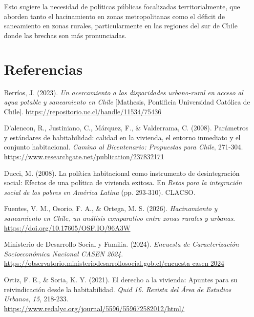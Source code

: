 \documentclass[
  spanish,
  a4paper,
  oneside]{scrbook}
\newlength{\cslhangindent}
\newenvironment{CSLReferences}[2] %
 {\begin{list}{}{%
  \setlength{\itemindent}{0pt}
  \setlength{\leftmargin}{0pt}
  \setlength{\parsep}{0pt}
  \ifodd #1
   \setlength{\leftmargin}{\cslhangindent}
   \setlength{\itemindent}{-1\cslhangindent}
  \fi
  \setlength{\itemsep}{#2\baselineskip}}}
 {\end{list}}
\begin{document}
Esto sugiere la necesidad de políticas públicas focalizadas
territorialmente, que aborden tanto el hacinamiento en zonas
metropolitanas como el déficit de saneamiento en zonas rurales,
particularmente en las regiones del sur de Chile donde las brechas son
más pronunciadas.


\chapter{Referencias}\label{referencias}

\protect{}\label{refs}
\begin{CSLReferences}{1}{0}
Berríos, J. (2023). \emph{Un acercamiento a las disparidades
urbano-rural en acceso al agua potable y saneamiento en {Chile}}
{[}Mathesis, Pontificia Universidad Católica de Chile{]}.
\url{https://repositorio.uc.cl/handle/11534/75436}

D'alencon, R., Justiniano, C., Márquez, F., \& Valderrama, C. (2008).
Parámetros y estándares de habitabilidad: calidad en la vivienda, el
entorno inmediato y el conjunto habitacional. \emph{Camino al
Bicentenario: Propuestas para Chile}, 271-304.
\url{https://www.researchgate.net/publication/237832171}

Ducci, M. (2008). La política habitacional como instrumento de
desintegración social: Efectos de una política de vivienda exitosa. En
\emph{Retos para la integración social de los pobres en {América
Latina}} (pp. 293-310). {CLACSO}.

Fuentes, V. M., Osorio, F. A., \& Ortega, M. S. (2026).
\emph{Hacinamiento y saneamiento en {Chile}, un análisis comparativo
entre zonas rurales y urbanas}.
\url{https://doi.org/10.17605/OSF.IO/96A3W}

Ministerio de Desarrollo Social y Familia. (2024). \emph{Encuesta de
Caracterización Socioeconómica Nacional {CASEN} 2024}.
\url{https://observatorio.ministeriodesarrollosocial.gob.cl/encuesta-casen-2024}

Ortiz, F. E., \& Soria, K. Y. (2021). El derecho a la vivienda: Apuntes
para su reivindicación desde la habitabilidad. \emph{Quid 16. Revista
del Área de Estudios Urbanos}, \emph{15}, 218-233.
\url{https://www.redalyc.org/journal/5596/559672582012/html/}


\end{CSLReferences}
\end{document}
